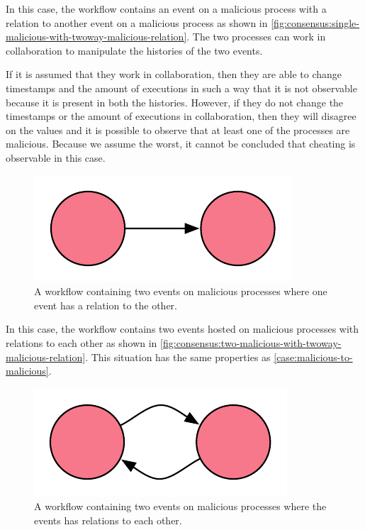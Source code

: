 	\begin{case}
		In this case, the workflow contains an event on a malicious process with a relation to another event on a malicious process as shown in \autoref{fig:consensus:single-malicious-with-twoway-malicious-relation}. The two processes can work in collaboration to manipulate the histories of the two events. 
		
		If it is assumed that they work in collaboration, then they are able to change timestamps and the amount of executions in such a way that it is not observable because it is present in both the histories. However, if they do not change the timestamps or the amount of executions in collaboration, then they will disagree on the values and it is possible to observe that at least one of the processes are malicious. Because we assume the worst, it cannot be concluded that cheating is observable in this case.
		\label{case:malicious-to-malicious}
	\end{case}
	
	\begin{figure}[H]
		\centering
		\includegraphics{6validation/images/4.pdf}
		\caption{A workflow containing two events on malicious processes where one event has a relation to the other.}
		\label{fig:consensus:single-malicious-with-twoway-malicious-relation}
	\end{figure}
	
	\begin{case}
		In this case, the workflow contains two events hosted on malicious processes with relations to each other as shown in \autoref{fig:consensus:two-malicious-with-twoway-malicious-relation}. This situation has the same properties as \autoref{case:malicious-to-malicious}.
		\label{case:malicious-to-from-malicious}
	\end{case}

	\begin{figure}[H]
		\centering
		\includegraphics{6validation/images/7.pdf}
		\caption{A workflow containing two events on malicious processes where the events has relations to each other.}
		\label{fig:consensus:two-malicious-with-twoway-malicious-relation}
	\end{figure}
	
